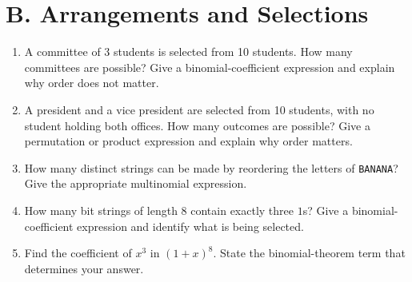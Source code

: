 \section*{B. Arrangements and Selections}

\begin{enumerate}[label=\textbf{B.\arabic*.}]
    \item A committee of 3 students is selected from 10 students. How many
    committees are possible? Give a binomial-coefficient expression and explain
    why order does not matter.

    \item A president and a vice president are selected from 10 students, with
    no student holding both offices. How many outcomes are possible? Give a
    permutation or product expression and explain why order matters.

    \item How many distinct strings can be made by reordering the letters of
    \texttt{BANANA}? Give the appropriate multinomial expression.

    \item How many bit strings of length 8 contain exactly three $1$s? Give a
    binomial-coefficient expression and identify what is being selected.

    \item Find the coefficient of $x^3$ in $(1+x)^8$. State the binomial-theorem
    term that determines your answer.
\end{enumerate}

\newpage
